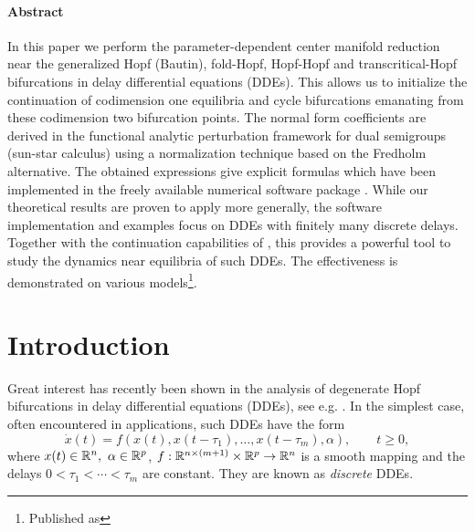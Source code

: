 \paragraph{{\color{header1}Abstract}} In this paper we perform the
parameter-dependent center manifold reduction near the generalized Hopf
(Bautin), fold-Hopf, Hopf-Hopf and transcritical-Hopf bifurcations in delay
differential equations (DDEs). This allows us to initialize the continuation of
codimension one equilibria and cycle bifurcations emanating from these
codimension two bifurcation points. The normal form coefficients are derived in
the functional analytic perturbation framework for dual semigroups (sun-star
calculus) using a normalization technique based on the Fredholm alternative.
The obtained expressions give explicit formulas which have been implemented in
the freely available numerical software package \DDEBIFTOOL. While our
theoretical results are proven to apply more generally, the software
implementation and examples focus on DDEs with finitely many discrete delays.
Together with the continuation capabilities of \DDEBIFTOOL, this provides a
powerful tool to study the dynamics near equilibria of such DDEs. The
effectiveness is demonstrated on various models\footnote{Published as
}.

\section{Introduction}\label{switch:sec:introduction}
Great interest has recently been shown in the analysis of degenerate Hopf bifurcations in delay differential equations (DDEs), see e.g. \cite{MR2296886, MR3020901, Xu2010, MR2819829, Wang2010Hopftranscritical, Ma2011, MR3178278, MR2775253, qesmi2014HH, Agrawal2016, MR2889930, MR3047823, MR3342118, Peng2013, MR3146341, MR3430930, Song2009}.  In the simplest case, often encountered in applications, such DDEs have the form
%
\begin{equation}
  \label{switch:eq:discreteDDEs}
  \dot{x}(t)=f(x(t),x(t-\tau_1),\ldots,x(t-\tau_m),\alpha), \qquad t \geq 0,
\end{equation}
%
where  $x(t) \in \mathbb{R}^n,\ \alpha \in \mathbb{R}^p$, $f : \mathbb{R}^{n \times (m+1)} \times \mathbb{R}^p \to \mathbb{R}^n$ is a smooth mapping and the delays $0 < \tau_1 < \cdots <\tau_m$ are constant. They are known as \emph{discrete} DDEs.


